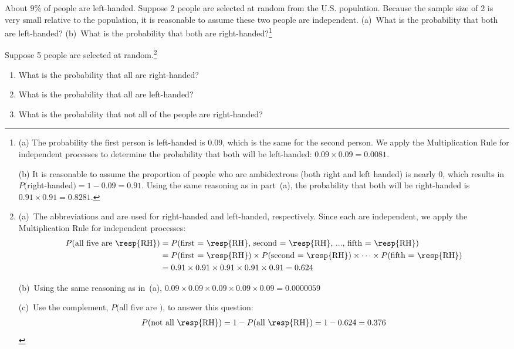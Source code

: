 \textPE{\pagebreak}

\begin{exercise} \label{ex2Handedness}
About 9\% of people are left-handed. Suppose 2 people are selected at random from the U.S. population. Because the sample size of 2 is very small relative to the population, it is reasonable to assume these two people are independent. (a)~What is the probability that both are left-handed? (b)~What is the probability that both are right-handed?\footnote{(a) The probability the first person is left-handed is $0.09$, which is the same for the second person. We apply the Multiplication Rule for independent processes to determine the probability that both will be left-handed: $0.09\times 0.09 = 0.0081$.

(b) It is reasonable to assume the proportion of people who are ambidextrous (both right and left handed) is nearly 0, which results in $P($right-handed$)=1-0.09=0.91$. Using the same reasoning as in part~(a), the probability that both will be right-handed is $0.91\times 0.91 = 0.8281$.}
\end{exercise}

\begin{exercise} \label{ex5Handedness}
Suppose 5 people are selected at random.\footnote{(a)~The abbreviations  and  are used for right-handed and left-handed, respectively. Since each are independent, we apply the Multiplication Rule for independent processes:
\begin{align*}
P(\text{all five are \resp{RH}})
&= P(\text{first = \resp{RH}, second = \resp{RH}, ..., fifth = \resp{RH}}) \\
&= P(\text{first = \resp{RH}})\times P(\text{second = \resp{RH}})\times  \dots \times P(\text{fifth = \resp{RH}}) \\
&= 0.91\times 0.91\times 0.91\times 0.91\times 0.91 = 0.624
\end{align*}

(b)~Using the same reasoning as in~(a), $0.09\times 0.09\times 0.09\times 0.09\times 0.09 = 0.0000059$

(c)~Use the complement, $P($all five are $)$, to answer this question:
\begin{align*}
P(\text{not all \resp{RH}})
	= 1 - P(\text{all \resp{RH}})
	= 1 - 0.624 = 0.376
\end{align*}} \vspace{-1.5mm}
\begin{enumerate}
\setlength{\itemsep}{0mm}
\item[(a)] What is the probability that all are right-handed?
\item[(b)] What is the probability that all are left-handed?
\item[(c)] What is the probability that not all of the people are right-handed?
\end{enumerate}
\end{exercise}

